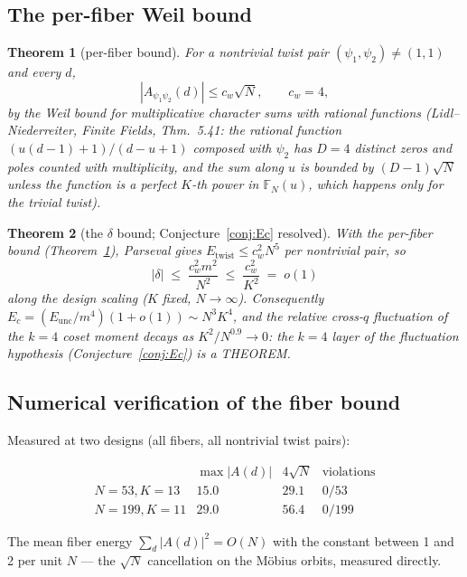 \documentclass[11pt,reqno]{amsart}
\newtheorem{theorem}{Theorem}[section]
\theoremstyle{definition}
\begin{document}
\subsection{The per-fiber Weil bound}

\begin{theorem}[per-fiber bound]
\label{thm:fiberweil}
For a nontrivial twist pair $(\psi_1,\psi_2) \neq (1,1)$ and every $d$,
\[
  |A_{\psi_1\psi_2}(d)| \le c_w \sqrt{N}, \qquad c_w = 4,
\]
by the Weil bound for multiplicative character sums with rational
functions (Lidl--Niederreiter, \emph{Finite Fields}, Thm.~5.41: the
rational function $(u(d{-}1)+1)/(d{-}u+1)$ composed with $\psi_2$ has
$D = 4$ distinct zeros and poles counted with multiplicity, and the
sum along $u$ is bounded by $(D-1)\sqrt{N}$ unless the function is a
perfect $K$-th power in $\mathbb{F}_N(u)$, which happens only for the
trivial twist).
\end{theorem}

\begin{theorem}[the $\delta$ bound; Conjecture~\ref{conj:Ec} resolved]
\label{thm:deltabound}
With the per-fiber bound (Theorem~\ref{thm:fiberweil}), Parseval gives
$E_{\mathrm{twist}} \le c_w^2 N^5$ per nontrivial pair, so
\[
  |\delta| \;\le\; \frac{c_w^2 m^2}{N^2} \;\le\; \frac{c_w^2}{K^2}
  \;=\; o(1)
\]
along the design scaling ($K$ fixed, $N \to \infty$).  Consequently
$E_c = (E_{\mathrm{unc}}/m^4)(1 + o(1)) \sim N^3 K^4$, and the
relative cross-$q$ fluctuation of the $k{=}4$ coset moment decays as
$K^2/N^{0.9} \to 0$: the $k{=}4$ layer of the fluctuation hypothesis
(Conjecture~\ref{conj:Ec}) is a THEOREM.
\end{theorem}

\subsection{Numerical verification of the fiber bound}

Measured at two designs (all fibers, all nontrivial twist pairs):

\[
\begin{array}{lccc}
 & \max |A(d)| & 4\sqrt{N} & \text{violations}\\
N = 53, K = 13 & 15.0 & 29.1 & 0/53\\
N = 199, K = 11 & 29.0 & 56.4 & 0/199
\end{array}
\]

The mean fiber energy $\sum_d |A(d)|^2 = O(N)$ with the constant
between 1 and 2 per unit $N$ --- the $\sqrt{N}$ cancellation on the
M\"obius orbits, measured directly.
\end{document}
